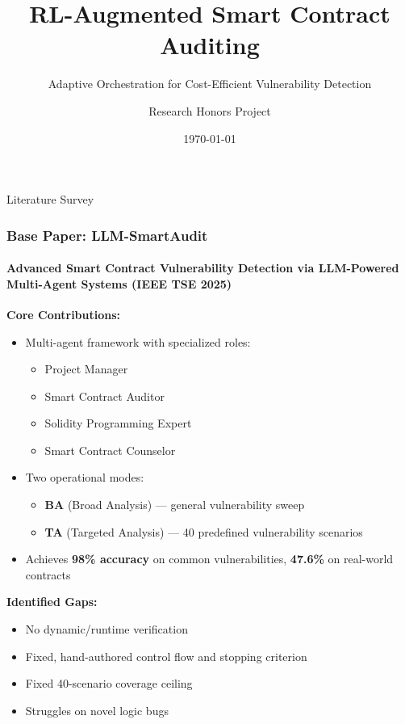 \documentclass[aspectratio=169]{beamer}
\title{RL-Augmented Smart Contract Auditing}
\subtitle{Adaptive Orchestration for Cost-Efficient Vulnerability Detection}
\author{Research Honors Project}
\date{\today}
\begin{document}
\begin{frame}
\titlepage
\end{frame}

\begin{frame}{Literature Survey}
\frametitle{Base Paper: LLM-SmartAudit}
\framesubtitle{Advanced Smart Contract Vulnerability Detection via LLM-Powered Multi-Agent Systems (IEEE TSE 2025)}

\vspace{0.3cm}

\textbf{Core Contributions:}
\begin{itemize}
    \item Multi-agent framework with specialized roles:
    \begin{itemize}
        \item Project Manager
        \item Smart Contract Auditor
        \item Solidity Programming Expert
        \item Smart Contract Counselor
    \end{itemize}
    \item Two operational modes:
    \begin{itemize}
        \item \textbf{BA} (Broad Analysis) — general vulnerability sweep
        \item \textbf{TA} (Targeted Analysis) — 40 predefined vulnerability scenarios
    \end{itemize}
    \item Achieves \textbf{98\% accuracy} on common vulnerabilities, \textbf{47.6\%} on real-world contracts
\end{itemize}

\vspace{0.3cm}

\textbf{\textcolor{costred}{Identified Gaps:}}
\begin{itemize}
    \item No dynamic/runtime verification
    \item Fixed, hand-authored control flow and stopping criterion
    \item Fixed 40-scenario coverage ceiling
    \item Struggles on novel logic bugs
\end{itemize}

\end{frame}
\end{document}
